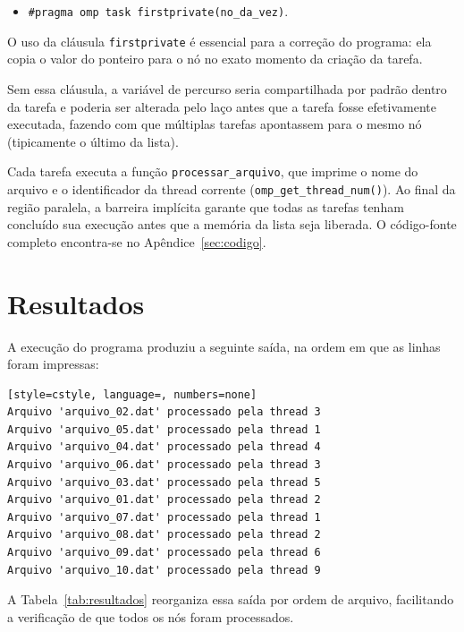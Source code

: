 \documentclass[a4paper,12pt]{article}
\begin{document}
\begin{itemize}
    \item \texttt{\#pragma omp task firstprivate(no\_da\_vez)}. 
\end{itemize}

O uso da cláusula \texttt{firstprivate} é essencial para a correção do programa: ela copia o valor do ponteiro para o nó no exato momento da criação da tarefa. 

Sem essa cláusula, a variável de percurso seria compartilhada por padrão dentro da tarefa e poderia ser alterada pelo laço antes que a tarefa fosse efetivamente executada, 
fazendo com que múltiplas tarefas apontassem para o mesmo nó (tipicamente o último da lista).

Cada tarefa executa a função \texttt{processar\_arquivo}, que imprime o nome do arquivo e o 
identificador da thread corrente (\texttt{omp\_get\_thread\_num()}). Ao final da região paralela, 
a barreira implícita garante que todas as tarefas tenham concluído sua execução antes que a memória da lista seja liberada. 
O código-fonte completo encontra-se no Apêndice~\ref{sec:codigo}.

\section{Resultados}

A execução do programa produziu a seguinte saída, na ordem em que as linhas foram impressas:

\begin{lstlisting}[style=cstyle, language=, numbers=none]
Arquivo 'arquivo_02.dat' processado pela thread 3
Arquivo 'arquivo_05.dat' processado pela thread 1
Arquivo 'arquivo_04.dat' processado pela thread 4
Arquivo 'arquivo_06.dat' processado pela thread 3
Arquivo 'arquivo_03.dat' processado pela thread 5
Arquivo 'arquivo_01.dat' processado pela thread 2
Arquivo 'arquivo_07.dat' processado pela thread 1
Arquivo 'arquivo_08.dat' processado pela thread 2
Arquivo 'arquivo_09.dat' processado pela thread 6
Arquivo 'arquivo_10.dat' processado pela thread 9
\end{lstlisting}

A Tabela~\ref{tab:resultados} reorganiza essa saída por ordem de arquivo, facilitando a verificação de que todos os nós foram processados.
\end{document}
